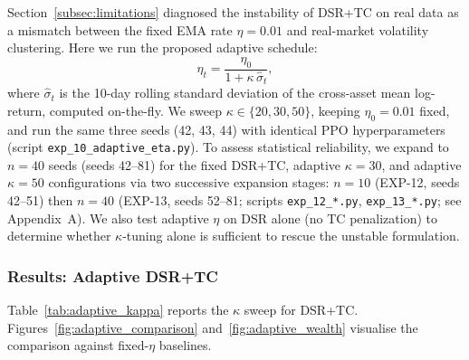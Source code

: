 \documentclass[conference]{IEEEtran}
\begin{document}
Section~\ref{subsec:limitations} diagnosed the instability of DSR+TC on
real data as a mismatch between the fixed EMA rate $\eta=0.01$ and
real-market volatility clustering. Here we run the proposed adaptive
schedule:
\begin{equation}\label{eq:adaptive_eta}
\eta_t = \frac{\eta_0}{1 + \kappa\,\hat{\sigma}_t},
\end{equation}
where $\hat{\sigma}_t$ is the 10-day rolling standard deviation of the
cross-asset mean log-return, computed on-the-fly. We sweep
$\kappa \in \{20, 30, 50\}$, keeping $\eta_0 = 0.01$ fixed, and
run the same three seeds (42, 43, 44) with identical PPO hyperparameters
(script \texttt{exp\_10\_adaptive\_eta.py}).
To assess statistical reliability, we expand to $n=40$ seeds
(seeds 42--81) for the fixed DSR+TC, adaptive $\kappa=30$, and adaptive
$\kappa=50$ configurations via two successive expansion stages:
$n=10$ (EXP-12, seeds 42--51) then $n=40$ (EXP-13, seeds 52--81;
scripts \texttt{exp\_12\_*.py}, \texttt{exp\_13\_*.py}; see Appendix~A).
We also test adaptive $\eta$ on DSR alone (no TC penalization) to determine
whether $\kappa$-tuning alone is sufficient to rescue the unstable formulation.

\subsubsection{Results: Adaptive DSR+TC}

Table~\ref{tab:adaptive_kappa} reports the $\kappa$ sweep for DSR+TC.
Figures~\ref{fig:adaptive_comparison} and~\ref{fig:adaptive_wealth}
visualise the comparison against fixed-$\eta$ baselines.

\begin{table}[t]
\caption{Adaptive $\eta$ Sweep for DSR+TC --- Real S\&P~500 (SR: $n=40$; CumRet/TO: $n=3$)}
\label{tab:adaptive_kappa}
\centering
{}
\end{table}
\end{document}
